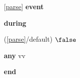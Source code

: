 \noindent \ref{parse}  \textbf{event}
\begin{block}
  \item   \textbf{during}
  \begin{block}
  \item[ (\ref{parse}/default) ]{$\false $} %
  \end{block}
  \item   \textbf{any} vv
  \item   \textbf{end} \\
\end{block}
